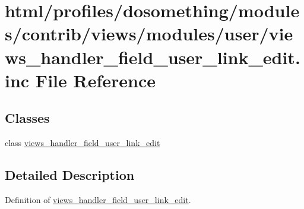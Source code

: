 \hypertarget{views__handler__field__user__link__edit_8inc}{
\section{html/profiles/dosomething/modules/contrib/views/modules/user/views\_\-handler\_\-field\_\-user\_\-link\_\-edit.inc File Reference}
\label{views__handler__field__user__link__edit_8inc}
}
\subsection*{Classes}
\begin{DoxyCompactItemize}
\item 
class \hyperlink{classviews__handler__field__user__link__edit}{views\_\-handler\_\-field\_\-user\_\-link\_\-edit}
\end{DoxyCompactItemize}


\subsection{Detailed Description}
Definition of \hyperlink{classviews__handler__field__user__link__edit}{views\_\-handler\_\-field\_\-user\_\-link\_\-edit}. 